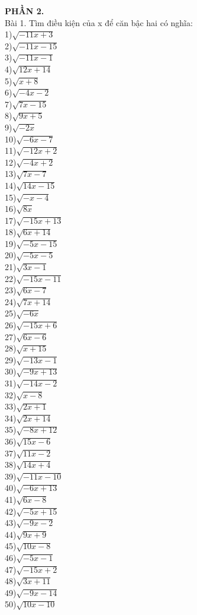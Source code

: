 \documentclass[12pt,a4paper]{article}
\begin{document}
\textbf{PHẦN 2.}\\	
	
Bài 1. Tìm điều kiện của x để căn bậc hai có nghĩa:\\
1)$\sqrt{-11x+3}$\\
2)$\sqrt{-11x-15}$\\
3)$\sqrt{-11x-1}$\\
4)$\sqrt{12x+14}$\\
5)$\sqrt{x+8}$\\
6)$\sqrt{-4x-2}$\\
7)$\sqrt{7x-15}$\\
8)$\sqrt{9x+5}$\\
9)$\sqrt{-2x}$\\
10)$\sqrt{-6x-7}$\\
11)$\sqrt{-12x+2}$\\
12)$\sqrt{-4x+2}$\\
13)$\sqrt{7x-7}$\\
14)$\sqrt{14x-15}$\\
15)$\sqrt{-x-4}$\\
16)$\sqrt{8x}$\\
17)$\sqrt{-15x+13}$\\
18)$\sqrt{6x+14}$\\
19)$\sqrt{-5x-15}$\\
20)$\sqrt{-5x-5}$\\
21)$\sqrt{3x-1}$\\
22)$\sqrt{-15x-11}$\\
23)$\sqrt{6x-7}$\\
24)$\sqrt{7x+14}$\\
25)$\sqrt{-6x}$\\
26)$\sqrt{-15x+6}$\\
27)$\sqrt{6x-6}$\\
28)$\sqrt{x+15}$\\
29)$\sqrt{-13x-1}$\\
30)$\sqrt{-9x+13}$\\
31)$\sqrt{-14x-2}$\\
32)$\sqrt{x-8}$\\
33)$\sqrt{2x+1}$\\
34)$\sqrt{2x+14}$\\
35)$\sqrt{-8x+12}$\\
36)$\sqrt{15x-6}$\\
37)$\sqrt{11x-2}$\\
38)$\sqrt{14x+4}$\\
39)$\sqrt{-11x-10}$\\
40)$\sqrt{-6x+13}$\\
41)$\sqrt{6x-8}$\\
42)$\sqrt{-5x+15}$\\
43)$\sqrt{-9x-2}$\\
44)$\sqrt{9x+9}$\\
45)$\sqrt{10x-8}$\\
46)$\sqrt{-5x-1}$\\
47)$\sqrt{-15x+2}$\\
48)$\sqrt{3x+11}$\\
49)$\sqrt{-9x-14}$\\
50)$\sqrt{10x-10}$\\
\end{document}

